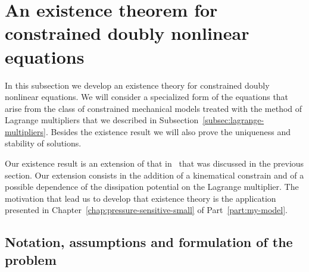 \documentclass[a4paper,10pt,twoside]{amsbook}
\numberwithin{section}{chapter}
\numberwithin{equation}{chapter}
\theoremstyle{definition}
\begin{document}
\section{An existence theorem for constrained doubly nonlinear equations}
\label{sec:existence-theorem-abstract-constrained}

In this subsection we develop an existence theory for constrained doubly nonlinear equations. We will consider a specialized form of the equations that arise from the class of constrained mechanical models treated with the method of Lagrange multipliers that we described in Subsection~\ref{subsec:lagrange-multipliers}. Besides the existence result we will also prove the uniqueness and stability of solutions.

Our existence result is an extension of that in~\cite[Proposition 11.1]{roubicek-pde} that was discussed in the previous section. Our extension consists in the addition of a kinematical constrain and of a possible dependence of the dissipation potential on the Lagrange multiplier. The motivation that lead us to develop that existence theory is the application presented in Chapter~\ref{chap:pressure-sensitive-small} of Part~\ref{part:my-model}.

\subsection{Notation, assumptions and formulation of the problem}
\end{document}
